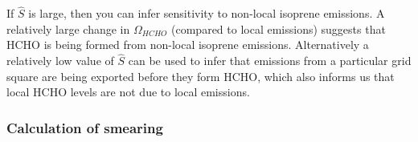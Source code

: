     If $\hat{S}$ is large, then you can infer sensitivity to non-local isoprene emissions.
    A relatively large change in $\Omega_{HCHO}$ (compared to local emissions) suggests that HCHO is being formed from non-local isoprene emissions.
    Alternatively a relatively low value of $\hat{S}$ can be used to infer that emissions from a particular grid square are being exported before they form HCHO, which also informs us that local HCHO levels are not due to local emissions.
    
    
    \subsubsection{Calculation of smearing}
    \label{BioIsop:Method:Smearing:calculation}
    
